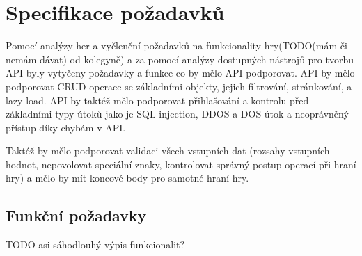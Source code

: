 \section{Specifikace požadavků}
Pomocí analýzy her a vyčlenění požadavků na funkcionality hry(TODO(mám či nemám dávat) od kolegyně) a za pomocí analýzy dostupných nástrojů pro tvorbu API byly vytyčeny požadavky a funkce co by mělo API podporovat. API by mělo podporovat CRUD operace se základními objekty, jejich filtrování, stránkování, a lazy load. API by taktéž mělo podporovat přihlašování a kontrolu před základními typy útoků jako je SQL injection, DDOS a DOS útok a neoprávněný přístup díky chybám v API.

Taktéž by mělo podporovat validaci všech vstupních dat (rozsahy vstupních hodnot, nepovolovat speciální znaky, kontrolovat správný postup operací při hraní hry) a mělo by mít koncové body pro samotné hraní hry.

\subsection{Funkční požadavky}
TODO asi sáhodlouhý výpis funkcionalit?


